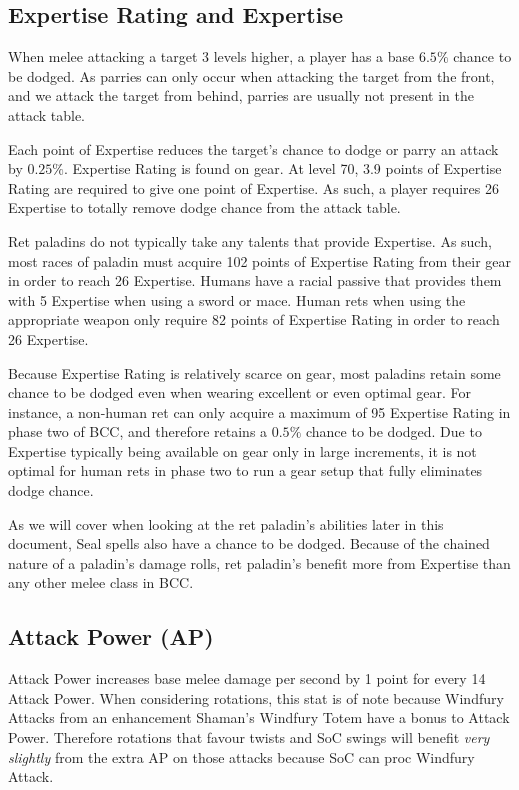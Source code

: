 \documentclass[letterpaper,11pt]{article}
\begin{document}
	\subsection{Expertise Rating and Expertise}
	When melee attacking a target 3 levels higher, a player has a base $6.5\%$ chance to be dodged.
	As parries can only occur when attacking the target from the front, and we attack the target from behind, parries are usually not present in the attack table.

	Each point of Expertise reduces the target's chance to dodge or parry an attack by $0.25\%$.
	Expertise Rating is found on gear.
	At level 70, 3.9 points of Expertise Rating are required to give one point of Expertise.
	As such, a player requires 26 Expertise to totally remove dodge chance from the attack table.
	
	Ret paladins do not typically take any talents that provide Expertise.
	As such, most races of paladin must acquire 102 points of Expertise Rating from their gear in order to reach 26 Expertise.
	Humans have a racial passive that provides them with 5 Expertise when using a sword or mace.
	Human rets when using the appropriate weapon only require 82 points of Expertise Rating in order to reach 26 Expertise.
	
	Because Expertise Rating is relatively scarce on gear, most paladins retain some chance to be dodged even when wearing excellent or even optimal gear.
	For instance, a non-human ret can only acquire a maximum of 95 Expertise Rating in phase two of BCC, and therefore retains a $0.5\%$ chance to be dodged.
	Due to Expertise typically being available on gear only in large increments, it is not optimal for human rets in phase two to run a gear setup that fully eliminates dodge chance.
	
	As we will cover when looking at the ret paladin's abilities later in this document, Seal spells also have a chance to be dodged.
	Because of the chained nature of a paladin's damage rolls, ret paladin's benefit more from Expertise than any other melee class in BCC.
	
	\subsection{Attack Power (AP)}
	Attack Power increases base melee damage per second by 1 point for every 14 Attack Power.
	When considering rotations, this stat is of note because Windfury Attacks from an enhancement Shaman's Windfury Totem have a bonus to Attack Power.
	Therefore rotations that favour twists and SoC swings will benefit \emph{very slightly} from the extra AP on those attacks because SoC can proc Windfury Attack.
	
\end{document}
